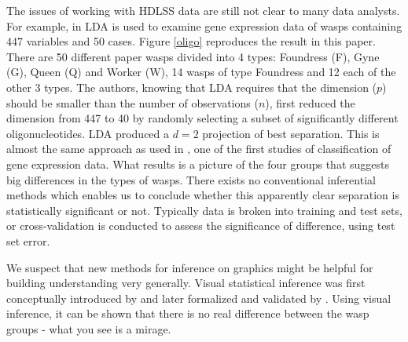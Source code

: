 The issues of working with HDLSS data are still not clear to many data analysts. For example, in \cite{toth:2010} LDA is used to examine gene expression data of wasps containing 447 variables and 50 cases. Figure \ref{oligo} reproduces the result in this paper. There are 50 different paper wasps divided into 4 types: Foundress (F), Gyne (G), Queen (Q) and Worker (W), 14  wasps of type Foundress and 12 each of the other 3 types. The authors, knowing that LDA requires that the dimension ($p$) should be smaller than the number of observations ($n$), first reduced the dimension from 447 to 40 by randomly selecting a subset of significantly different oligonucleotides. LDA produced a $d = 2$ projection of best separation. This is almost the same approach as used in \cite{dudoit:2002}, one of the first studies of classification of gene expression data. What results is a picture of the four groups that suggests big differences in the types of wasps. There exists no conventional inferential methods which enables us to conclude whether this apparently clear separation is statistically significant or not. Typically data is broken into training and test sets, or cross-validation is conducted to assess the significance of difference, using test set error. 

We suspect that new methods for inference on graphics might be helpful for building understanding very generally. Visual statistical inference was first conceptually introduced by \cite{buja:2009} and later formalized and validated by \cite{majumder:2011}. Using visual inference, it can be shown that there is no real difference between the wasp groups - what you see is a mirage. 

